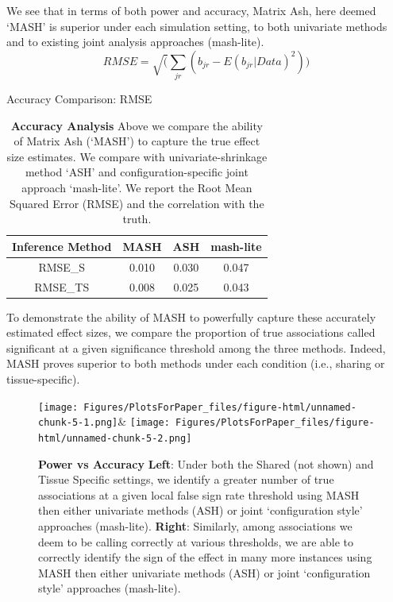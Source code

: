 We see that in terms of both power and accuracy, Matrix Ash, here deemed `MASH' is superior under each simulation setting, to both univariate methods and to existing joint analysis approaches (mash-lite).
\begin{equation}
RMSE = \sqrt(\sum_{jr}(b_{jr}-E(b_{jr}|Data)^2))
\end{equation}
\begin{table}[ht]
\caption{Accuracy Comparison: RMSE}
\centering
\begin{tabular}{c c c c}
\hline\hline
Inference Method & MASH & ASH & mash-lite \\ [0.5ex] %
\hline
RMSE_{S}&0.010&0.030&0.047\\
RMSE_{TS}&0.008& 0.025&0.043\\ %
\hline
\end{tabular}
\label{table:RMSE}
\caption{\textbf{Accuracy Analysis} Above we compare the ability of Matrix Ash (`MASH') to capture the true effect size estimates. We compare with univariate-shrinkage method `ASH' and configuration-specific joint approach `mash-lite'. We report the Root Mean Squared Error (RMSE) and the correlation with the truth.}
\end{table}

To demonstrate the ability of MASH to powerfully capture these accurately estimated effect sizes, we compare the proportion of true associations called significant at a given significance threshold among the three methods. Indeed, MASH proves superior to both methods under each condition (i.e., sharing or tissue-specific).

\begin{figure}[h]
\texttt{[image: Figures/PlotsForPaper\_files/figure-html/unnamed-chunk-5-1.png]}&
\texttt{[image: Figures/PlotsForPaper\_files/figure-html/unnamed-chunk-5-2.png]}
\caption{\textbf{Power vs Accuracy} \textbf{Left}: Under both the Shared (not shown) and Tissue Specific settings, we identify a greater number of true associations at a given local false sign rate threshold using MASH then either univariate methods (ASH) or joint `configuration style' approaches (mash-lite). \textbf{Right}: Similarly, among associations we deem to be calling correctly at various thresholds, we are able to correctly identify the sign of the effect in many more instances using MASH then either univariate methods (ASH) or joint `configuration style' approaches (mash-lite).}
\label{fig:powervaccuracy}
\end{figure}\newline

